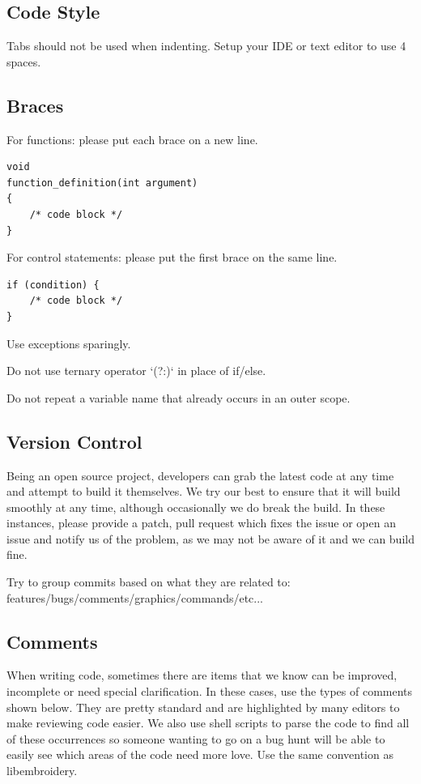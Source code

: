 \documentclass[a4paper]{report}
\begin{document}
\subsection{Code Style}

Tabs should not be used when indenting. Setup your IDE or text editor to use 4 spaces.

\subsection{Braces}

For functions: please put each brace on a new line.

\begin{lstlisting}
void
function_definition(int argument)
{
    /* code block */
}
\end{lstlisting}

For control statements: please put the first brace on the same line.

\begin{lstlisting}
if (condition) {
    /* code block */    
}
\end{lstlisting}

Use exceptions sparingly.

Do not use ternary operator `(?:)` in place of if/else.

Do not repeat a variable name that already occurs in an outer scope.

\subsection{Version Control}

Being an open source project, developers can grab the latest code at any time
and attempt to build it themselves. We try our best to ensure that it will build smoothly
at any time, although occasionally we do break the build. In these instances,
please provide a patch, pull request which fixes the issue or open an issue and
notify us of the problem, as we may not be aware of it and we can build fine.

Try to group commits based on what they are related to: features/bugs/comments/graphics/commands/etc...

\subsection{Comments}

When writing code, sometimes there are items that we know can be improved,
incomplete or need special clarification. In these cases, use the types of
comments shown below. They are pretty standard and are highlighted by many editors to
make reviewing code easier. We also use shell scripts to parse the code to find
all of these occurrences so someone wanting to go on a bug hunt will be able to
easily see which areas of the code need more love. Use the same convention
as libembroidery.
\end{document}
